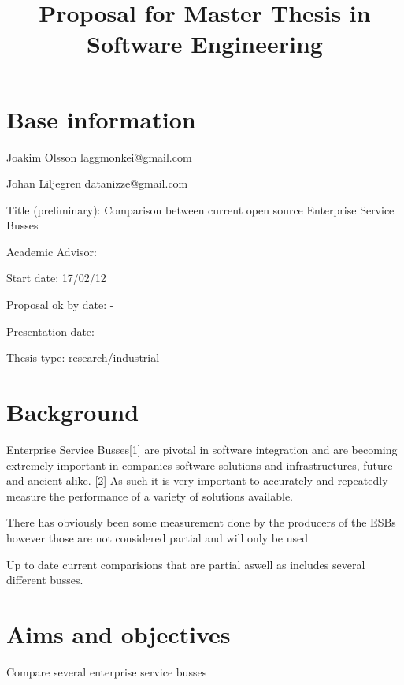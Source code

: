 \documentclass[10pt,a4paper]{proposal}
\title{Proposal for Master Thesis in Software Engineering}
\begin{document}
\maketitle
\thispagestyle{fancy}


\section*{Base information}

Joakim Olsson laggmonkei@gmail.com

Johan Liljegren datanizze@gmail.com

Title (preliminary): Comparison between current open source Enterprise Service Busses

Academic Advisor:  

Start date: 17/02/12

Proposal ok by date: -

Presentation date: -


Thesis type: research\slash industrial


\section*{Background}

Enterprise Service Busses[1] are pivotal in software integration and are becoming extremely important in companies software solutions and  infrastructures, future and ancient alike. [2]
As such it is very important to accurately and repeatedly measure the performance of a variety of solutions available. 

There has obviously been some measurement done by the producers of the ESBs however those are not considered partial and will only be used 

Up to date current comparisions that are partial aswell as includes several different busses.


\section*{Aims and objectives}
Compare several enterprise service busses
\end{document}

